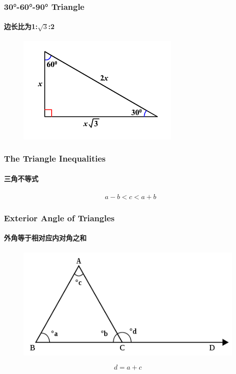 \documentclass[
	11pt, %
	handout,
]{beamer}
\begin{document}


\begin{frame}
	\frametitle{30°-60°-90° Triangle} %
	\framesubtitle{边长比为1:$\sqrt{3}$:2}
	\begin{figure}
		\includegraphics[width=0.5\linewidth]{30_60_90_triangle.png}
	\end{figure}	
\end{frame}



\begin{frame}
	\frametitle{The Triangle Inequalities} %
	\framesubtitle{三角不等式}
	\begin{theorem}
		\begin{equation*}
			\begin{aligned}
				&a-b<c<a+b 
			\end{aligned}
		\end{equation*}
	\end{theorem}
\end{frame}




\begin{frame}
	\frametitle{Exterior Angle of Triangles} %
	\framesubtitle{外角等于相对应内对角之和}
		\begin{figure}
		\includegraphics[width=0.5\linewidth]{Exterio_Angle.png}
	\end{figure}	
	\begin{theorem}
		\begin{equation*}
				d = a + c		
		\end{equation*}
	\end{theorem}
\end{frame}
\end{document}
